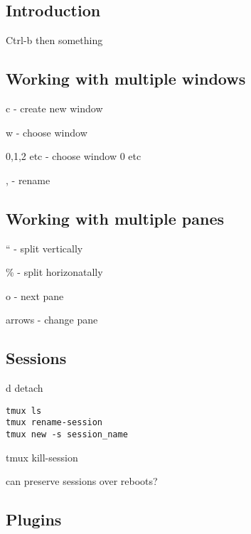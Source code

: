 
\subsection{Introduction}

Ctrl-b then something

\subsection{Working with multiple windows}

c - create new window

w - choose window

0,1,2 etc - choose window 0 etc

, - rename


\subsection{Working with multiple panes}

`` - split vertically

\% - split horizonatally

o - next pane

arrows - change pane


\subsection{Sessions}

d detach

\begin{verbatim}
tmux ls
tmux rename-session
tmux new -s session_name
\end{verbatim}

tmux kill-session

can preserve sessions over reboots?

\subsection{Plugins}

